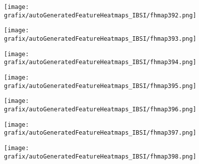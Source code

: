 \begin{subfigure}{\wid\textwidth} 
    \centering 
    \caption{\tiny \sffamily {}} 
    \vspace{\vsp} 
    \texttt{[image: grafix/autoGeneratedFeatureHeatmaps\_IBSI/fhmap392.png]} 
\end{subfigure} 
\hspace{\hsp} 
\begin{subfigure}{\wid\textwidth} 
    \centering 
    \caption{\tiny \sffamily {}} 
    \vspace{\vsp} 
    \texttt{[image: grafix/autoGeneratedFeatureHeatmaps\_IBSI/fhmap393.png]} 
\end{subfigure} 
\hspace{\hsp} 
\begin{subfigure}{\wid\textwidth} 
    \centering 
    \caption{\tiny \sffamily {}} 
    \vspace{\vsp} 
    \texttt{[image: grafix/autoGeneratedFeatureHeatmaps\_IBSI/fhmap394.png]} 
\end{subfigure} 
\hspace{\hsp} 
\begin{subfigure}{\wid\textwidth} 
    \centering 
    \caption{\tiny \sffamily {}} 
    \vspace{\vsp} 
    \texttt{[image: grafix/autoGeneratedFeatureHeatmaps\_IBSI/fhmap395.png]} 
\end{subfigure} 
\hspace{\hsp} 
\begin{subfigure}{\wid\textwidth} 
    \centering 
    \caption{\tiny \sffamily {}} 
    \vspace{\vsp} 
    \texttt{[image: grafix/autoGeneratedFeatureHeatmaps\_IBSI/fhmap396.png]} 
\end{subfigure} 
\hspace{\hsp} 
\begin{subfigure}{\wid\textwidth} 
    \centering 
    \caption{\tiny \sffamily {}} 
    \vspace{\vsp} 
    \texttt{[image: grafix/autoGeneratedFeatureHeatmaps\_IBSI/fhmap397.png]} 
\end{subfigure} 
\hspace{\hsp} 
\begin{subfigure}{\wid\textwidth} 
    \centering 
    \caption{\tiny \sffamily {}} 
    \vspace{\vsp} 
    \texttt{[image: grafix/autoGeneratedFeatureHeatmaps\_IBSI/fhmap398.png]} 
\end{subfigure} 
